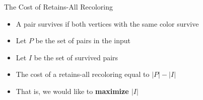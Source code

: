\begin{frame}{The Cost of Retains-All Recoloring}
\begin{itemize}

\item
A pair \alert{survives} if both vertices with the same color survive

\pause\item
Let $P$ be the set of pairs in the input  

\pause\item
Let $I$ be the set of survived pairs
 
\pause\item 
The cost of a retains-all recoloring equal to $|P| - |I|$

\pause\item 
That is, we would like to \textbf{maximize $|I|$}


\end{itemize}
\end{frame}